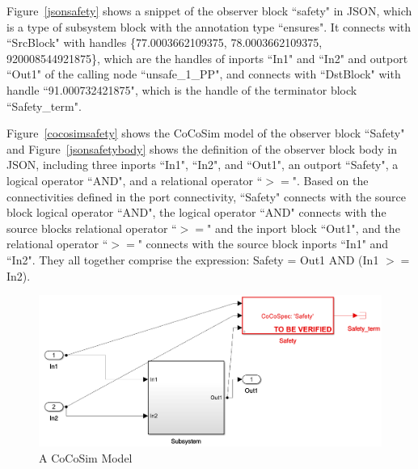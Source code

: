 \documentclass{article}
\begin{document}
Figure~\ref{jsonsafety} shows a snippet of the observer block ``safety" in JSON, which is a type of subsystem block with the annotation type \textsf{``ensures"}.
It connects with \textsf{``SrcBlock"} with handles\textsf{ \{77.0003662109375, 78.0003662109375, 920008544921875\}}, which are the handles of inports \textsf{``In1"} and \textsf{``In2"} and outport \textsf{``Out1"} of the calling node \textsf{``unsafe\_1\_PP"},  and connects with \textsf{``DstBlock"} with handle \textsf{``91.000732421875"}, which is the handle of the terminator block \textsf{``Safety\_term"}. 

Figure~\ref{cocosimsafety} shows the CoCoSim model of the observer block \textsf{``Safety"} and Figure~\ref{jsonsafetybody} shows the definition of the observer block body in JSON, including 
three inports \textsf{``In1", ``In2"}, and \textsf{``Out1"}, an outport \textsf{``Safety"}, a logical operator \textsf{``AND"}, and a relational operator \textsf{``$>=$"}. 
Based on the connectivities defined in the port connectivity, \textsf{``Safety"} connects with the source block logical operator \textsf{``AND"}, the logical operator \textsf{``AND"} connects with the source blocks relational operator \textsf{``$>=$"} and the inport block \textsf{``Out1"}, and the relational operator \textsf{``$>=$"} connects
with the source block inports \textsf{``In1"} and \textsf{``In2"}. 
They all together comprise the expression: \textsf{Safety = Out1 AND (In1 $>=$ In2)}.

\begin{figure}[h]
\begin{center}
    \includegraphics[scale=0.25]{figures/safety000}
\end{center}  
  \caption{A CoCoSim Model}
  \label{cocosimmodel}
\end{figure}
\end{document}
